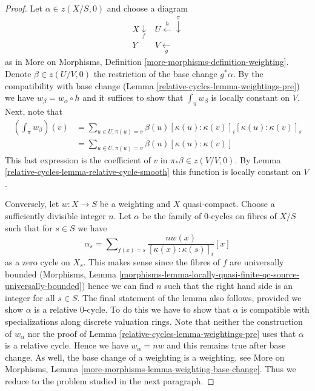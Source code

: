 \begin{proof}
Let $\alpha \in z(X/S, 0)$ and choose a diagram
$$
\begin{array}{cc}X \underset{f}{\downarrow} & U \overset{h}{\longleftarrow}\overset{\pi}{\downarrow} \\ Y & V \underset{g}{\longleftarrow}\end{array}
$$
as in More on Morphisms, Definition \ref{more-morphisms-definition-weighting}.
Denote $\beta \in z(U/V, 0)$ the restriction of the base change $g^*\alpha$.
By the compatibility with base change (Lemma \ref{relative-cycles-lemma-weightings-pre})
we have $w_\beta = w_\alpha \circ h$ and it suffices to show that
$\int_\pi w_\beta$ is locally constant on $V$. Next, note that
\begin{align*}
\left( \int_\pi w_\beta \right)(v)
& =
\sum\nolimits_{u \in U, \pi(u) = v}
\beta(u) [\kappa(u) : \kappa(v)]_i [\kappa(u) : \kappa(v)]_s \\
& =
\sum\nolimits_{u \in U, \pi(u) = v} \beta(u)[\kappa(u) : \kappa(v)]
\end{align*}
This last expression is the coefficient of $v$ in $\pi_*\beta \in z(V/V, 0)$.
By Lemma \ref{relative-cycles-lemma-relative-cycle-smooth} this function is locally
constant on $V$.

\medskip\noindent
Conversely, let $w : X \to S$ be a weighting and $X$ quasi-compact.
Choose a sufficiently divisible integer $n$. Let $\alpha$ be the family
of $0$-cycles on fibres of $X/S$ such that for $s \in S$ we have
$$
\alpha_s =
\sum\nolimits_{f(x) = s} \frac{n w(x)}{[\kappa(x) : \kappa(s)]_i} [x]
$$
as a zero cycle on $X_s$.
This makes sense since the fibres of $f$ are universally bounded
(Morphisms, Lemma
\ref{morphisms-lemma-locally-quasi-finite-qc-source-universally-bounded})
hence we can find $n$ such that the right hand side is an integer for
all $s \in S$. The final statement of the lemma also follows, provided
we show $\alpha$ is a relative $0$-cycle. To do this we have to
show that $\alpha$ is compatible with specializations along discrete
valuation rings. Note that neither the construction of $w_\alpha$
nor the proof of Lemma \ref{relative-cycles-lemma-weightings-pre} uses that $\alpha$
is a relative cycle. Hence we have $w_\alpha = nw$ and this remains
true after base change. As well, the base change of a weighting
is a weighting, see
More on Morphisms, Lemma \ref{more-morphisms-lemma-weighting-base-change}.
Thus we reduce to the problem studied in the next paragraph.


\end{proof}
